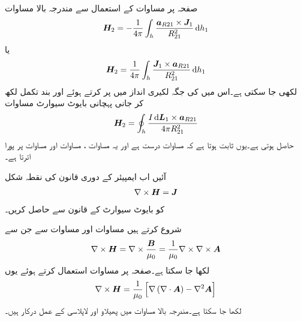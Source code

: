 صفحہ  پر مساوات  کے استعمال سے مندرجہ بالا مساوات
\begin{align*}
\kvec{H}_2=-\frac{1}{4\pi}  \int_h \frac{\kvec{a}_{R21} \times \kvec{J}_1}{R_{21}^2}\dif h_1
\end{align*}
یا
\begin{align*}
\kvec{H}_2=\frac{1}{4\pi}  \int_h \frac{\kvec{J}_1 \times \kvec{a}_{R21} }{R_{21}^2}\dif h_1
\end{align*}
لکھی جا سکتی ہے۔اس میں  کی جگہ لکیری انداز میں  پر کرتے ہوئے اور بند تکمل لکھ کر جانی پہچانی بایوٹ سیوارٹ مساوات
\begin{align*}
\kvec{H}_2= \oint_h \frac{I \dif \kvec{L}_1 \times \kvec{a}_{R21} }{4\pi R_{21}^2}
\end{align*}
حاصل ہوتی ہے۔یوں ثابت ہوتا ہے کہ مساوات  درست ہے اور یہ مساوات ، مساوات  اور مساوات  پر پورا اترتا ہے۔


آئیں اب ایمپیئر کے دوری قانون کی نقطہ شکل
\begin{align}
\nabla \times {\ensuremath{{\boldsymbol{H}}}}={{\boldsymbol{J}}}
\end{align}
کو بایوٹ سیوارٹ کے قانون سے حاصل کریں۔

شروع کرتے ہیں مساوات  اور مساوات  سے جن سے
\begin{align}
\nabla \times {\ensuremath{{\boldsymbol{H}}}}=\nabla \times \frac{{{\boldsymbol{B}}}}{\mu_0}=\frac{1}{\mu_0} \nabla \times \nabla \times {\ensuremath{{\boldsymbol{A}}}}
\end{align}
لکھا جا سکتا ہے۔صفحہ  پر مساوات  استعمال کرتے ہوئے یوں
\begin{align}\label{مساوات_مقناطیسی_مقناطیسی_میدان_کے_شدت_کی_گردش}
\nabla \times {\ensuremath{{\boldsymbol{H}}}}=\frac{1}{\mu_0} \left[\nabla \left(\nabla \cdot {\ensuremath{{\boldsymbol{A}}}} \right)-\nabla^2 {{\boldsymbol{A}}} \right]
\end{align}
لکھا جا سکتا ہے۔مندرجہ بالا مساوات میں پھیلاو اور لاپلاسی کے عمل درکار ہیں۔

